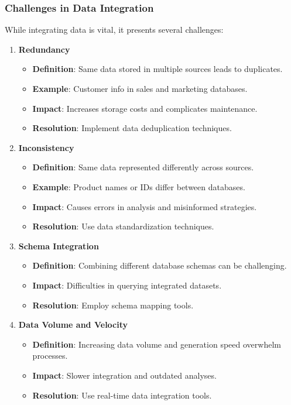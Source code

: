 \documentclass[aspectratio=169]{beamer}
\begin{document}
\begin{frame}[fragile]
    \frametitle{Challenges in Data Integration}
    While integrating data is vital, it presents several challenges:
    \begin{enumerate}
        \item \textbf{Redundancy}
            \begin{itemize}
                \item \textbf{Definition}: Same data stored in multiple sources leads to duplicates.
                \item \textbf{Example}: Customer info in sales and marketing databases.
                \item \textbf{Impact}: Increases storage costs and complicates maintenance.
                \item \textbf{Resolution}: Implement data deduplication techniques.
            \end{itemize}
        
        \item \textbf{Inconsistency}
            \begin{itemize}
                \item \textbf{Definition}: Same data represented differently across sources.
                \item \textbf{Example}: Product names or IDs differ between databases.
                \item \textbf{Impact}: Causes errors in analysis and misinformed strategies.
                \item \textbf{Resolution}: Use data standardization techniques.
            \end{itemize}
        
        \item \textbf{Schema Integration}
            \begin{itemize}
                \item \textbf{Definition}: Combining different database schemas can be challenging.
                \item \textbf{Impact}: Difficulties in querying integrated datasets.
                \item \textbf{Resolution}: Employ schema mapping tools.
            \end{itemize}
        
        \item \textbf{Data Volume and Velocity}
            \begin{itemize}
                \item \textbf{Definition}: Increasing data volume and generation speed overwhelm processes.
                \item \textbf{Impact}: Slower integration and outdated analyses.
                \item \textbf{Resolution}: Use real-time data integration tools.
            \end{itemize}
    \end{enumerate}
\end{frame}
\end{document}
